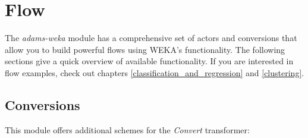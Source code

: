 
\chapter{Flow}
The \textit{adams-weka} module has a comprehensive set of actors and conversions
that allow you to build powerful flows using WEKA's functionality. The following
sections give a quick overview of available functionality. If you are interested
in flow examples, check out chapters \ref{classification_and_regression} and
\ref{clustering}.

\section{Conversions}
This module offers additional schemes for the \textit{Convert} transformer:
